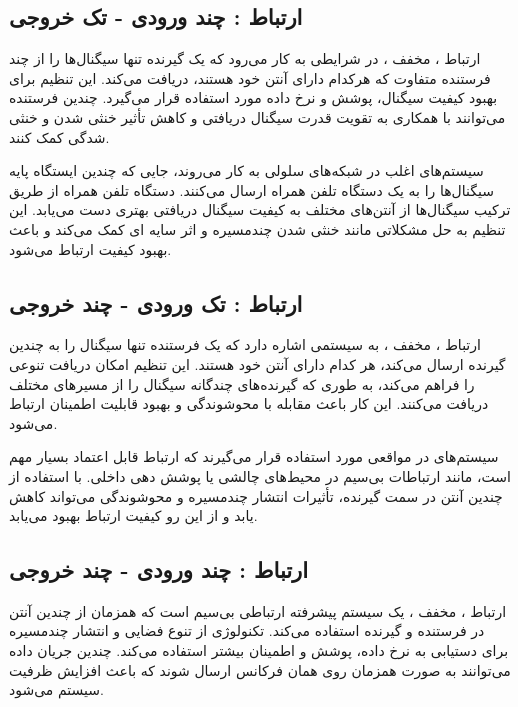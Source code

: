\subsection{
	ارتباط  : چند ورودی - تک خروجی
}

ارتباط ، مخفف ، در شرایطی به کار می‌رود که یک گیرنده تنها سیگنال‌ها را از چند فرستنده متفاوت که هرکدام دارای آنتن خود هستند، دریافت می‌کند. این تنظیم برای بهبود کیفیت سیگنال، پوشش و نرخ داده مورد استفاده قرار می‌گیرد. چندین فرستنده می‌توانند با همکاری به تقویت قدرت سیگنال دریافتی و کاهش تأثیر خنثی شدن و خنثی شدگی کمک کنند.

سیستم‌های  اغلب در شبکه‌های سلولی به کار می‌روند، جایی که چندین ایستگاه پایه سیگنال‌ها را به یک دستگاه تلفن همراه ارسال می‌کنند. دستگاه تلفن همراه از طریق ترکیب سیگنال‌ها از آنتن‌های مختلف به کیفیت سیگنال دریافتی بهتری دست می‌یابد. این تنظیم به حل مشکلاتی مانند خنثی شدن چندمسیره و اثر سایه ای کمک می‌کند و باعث بهبود کیفیت ارتباط می‌شود.

\subsection{
		ارتباط  : تک ورودی - چند خروجی
}

ارتباط ، مخفف ، به سیستمی اشاره دارد که یک فرستنده تنها سیگنال را به چندین گیرنده ارسال می‌کند، هر کدام دارای آنتن خود هستند. این تنظیم امکان دریافت تنوعی را فراهم می‌کند، به طوری که گیرنده‌های چندگانه سیگنال را از مسیرهای مختلف دریافت می‌کنند. این کار باعث مقابله با محوشوندگی و بهبود قابلیت اطمینان ارتباط می‌شود.

سیستم‌های  در مواقعی مورد استفاده قرار می‌گیرند که ارتباط قابل اعتماد بسیار مهم است، مانند ارتباطات بی‌سیم در محیط‌های چالشی یا پوشش دهی داخلی. با استفاده از چندین آنتن در سمت گیرنده، تأثیرات انتشار چندمسیره و محوشوندگی می‌تواند کاهش یابد و از این رو کیفیت ارتباط بهبود می‌یابد.

\subsection{
	ارتباط  : چند ورودی - چند خروجی
}

ارتباط ، مخفف ، یک سیستم پیشرفته ارتباطی بی‌سیم است که همزمان از چندین آنتن در فرستنده و گیرنده استفاده می‌کند. تکنولوژی  از تنوع فضایی و انتشار چندمسیره برای دستیابی به نرخ داده، پوشش و اطمینان بیشتر استفاده می‌کند. چندین جریان داده می‌توانند به صورت همزمان روی همان فرکانس ارسال شوند که باعث افزایش ظرفیت سیستم می‌شود.

